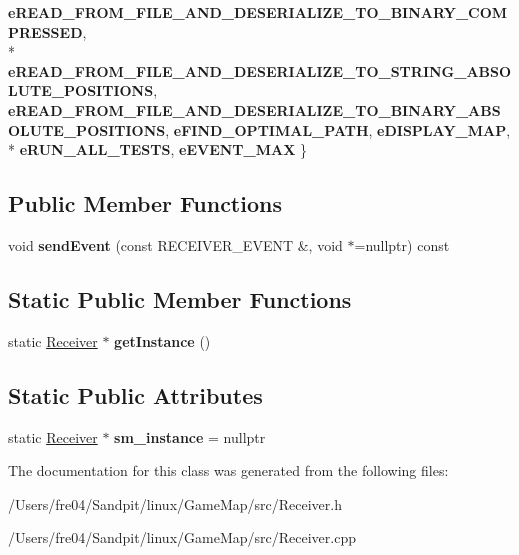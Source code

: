 \begin{DoxyCompactItemize}
{\bfseries e\+R\+E\+A\+D\+\_\+\+F\+R\+O\+M\+\_\+\+F\+I\+L\+E\+\_\+\+A\+N\+D\+\_\+\+D\+E\+S\+E\+R\+I\+A\+L\+I\+Z\+E\+\_\+\+T\+O\+\_\+\+B\+I\+N\+A\+R\+Y\+\_\+\+C\+O\+M\+P\+R\+E\+S\+S\+E\+D}, 
\\*
{\bfseries e\+R\+E\+A\+D\+\_\+\+F\+R\+O\+M\+\_\+\+F\+I\+L\+E\+\_\+\+A\+N\+D\+\_\+\+D\+E\+S\+E\+R\+I\+A\+L\+I\+Z\+E\+\_\+\+T\+O\+\_\+\+S\+T\+R\+I\+N\+G\+\_\+\+A\+B\+S\+O\+L\+U\+T\+E\+\_\+\+P\+O\+S\+I\+T\+I\+O\+N\+S}, 
{\bfseries e\+R\+E\+A\+D\+\_\+\+F\+R\+O\+M\+\_\+\+F\+I\+L\+E\+\_\+\+A\+N\+D\+\_\+\+D\+E\+S\+E\+R\+I\+A\+L\+I\+Z\+E\+\_\+\+T\+O\+\_\+\+B\+I\+N\+A\+R\+Y\+\_\+\+A\+B\+S\+O\+L\+U\+T\+E\+\_\+\+P\+O\+S\+I\+T\+I\+O\+N\+S}, 
{\bfseries e\+F\+I\+N\+D\+\_\+\+O\+P\+T\+I\+M\+A\+L\+\_\+\+P\+A\+T\+H}, 
{\bfseries e\+D\+I\+S\+P\+L\+A\+Y\+\_\+\+M\+A\+P}, 
\\*
{\bfseries e\+R\+U\+N\+\_\+\+A\+L\+L\+\_\+\+T\+E\+S\+T\+S}, 
{\bfseries e\+E\+V\+E\+N\+T\+\_\+\+M\+A\+X}
 \}\label{class_receiver_a7c9717be84a4956c0d42d497e5cecd85}

\end{DoxyCompactItemize}
\subsection*{Public Member Functions}
\begin{DoxyCompactItemize}
\item 
\hypertarget{class_receiver_a0c7f6ac62761f9698705cc676fbc1837}{}void {\bfseries send\+Event} (const R\+E\+C\+E\+I\+V\+E\+R\+\_\+\+E\+V\+E\+N\+T \&, void $\ast$=nullptr) const \label{class_receiver_a0c7f6ac62761f9698705cc676fbc1837}

\end{DoxyCompactItemize}
\subsection*{Static Public Member Functions}
\begin{DoxyCompactItemize}
\item 
\hypertarget{class_receiver_a303e44cba0138cace41b77f3ff85e410}{}static \hyperlink{class_receiver}{Receiver} $\ast$ {\bfseries get\+Instance} ()\label{class_receiver_a303e44cba0138cace41b77f3ff85e410}

\end{DoxyCompactItemize}
\subsection*{Static Public Attributes}
\begin{DoxyCompactItemize}
\item 
\hypertarget{class_receiver_afb06337c85440a108828ba9d73d6707a}{}static \hyperlink{class_receiver}{Receiver} $\ast$ {\bfseries sm\+\_\+instance} = nullptr\label{class_receiver_afb06337c85440a108828ba9d73d6707a}

\end{DoxyCompactItemize}


The documentation for this class was generated from the following files\+:\begin{DoxyCompactItemize}
\item 
/\+Users/fre04/\+Sandpit/linux/\+Game\+Map/src/Receiver.\+h\item 
/\+Users/fre04/\+Sandpit/linux/\+Game\+Map/src/Receiver.\+cpp\end{DoxyCompactItemize}
